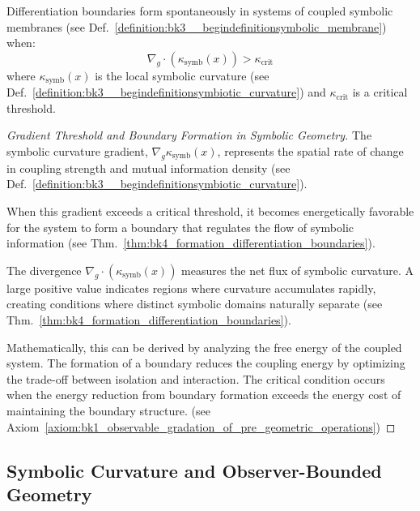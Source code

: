 \begin{theorem} \label{thm:bk4_formation_differentiation_boundaries}
Differentiation boundaries form spontaneously in systems of coupled symbolic membranes (see Def.~\ref{definition:bk3__begindefinitionsymbolic_membrane}) when:
\begin{equation}
    \nabla_g \cdot (\kappa_{\text{symb}}(x)) > \kappa_{\text{crit}}
\end{equation}
where $\kappa_{\text{symb}}(x)$ is the local symbolic curvature (see Def.~\ref{definition:bk3__begindefinitionsymbiotic_curvature}) and $\kappa_{\text{crit}}$ is a critical threshold.
\end{theorem}
\begin{proof}[Gradient Threshold and Boundary Formation in Symbolic Geometry]
\label{proof:bk4_symbolic_curvature_boundary}
The symbolic curvature gradient, 
$\nabla_g \kappa_{\text{symb}}(x)$, represents the spatial rate 
of change in coupling strength and mutual information density 
(see Def.~\ref{definition:bk3__begindefinitionsymbiotic_curvature}).

When this gradient exceeds a critical threshold, it becomes 
energetically favorable for the system to form a boundary 
that regulates the flow of symbolic information (see 
Thm.~\ref{thm:bk4_formation_differentiation_boundaries}).

The divergence $\nabla_g \cdot (\kappa_{\text{symb}}(x))$ measures the net flux of symbolic curvature. A large positive value indicates regions where curvature accumulates rapidly, creating conditions where distinct symbolic domains naturally separate (see Thm.~\ref{thm:bk4_formation_differentiation_boundaries}).

Mathematically, this can be derived by analyzing the free energy of the coupled system. The formation of a boundary reduces the coupling energy by optimizing the trade-off between isolation and interaction. The critical condition occurs when the energy reduction from boundary formation exceeds the energy cost of maintaining the boundary structure. (see Axiom~\ref{axiom:bk1_observable_gradation_of_pre_geometric_operations})
\end{proof}
\subsection{Symbolic Curvature and Observer-Bounded Geometry}
\label{subsec:bk4_symbolic_curvature}

